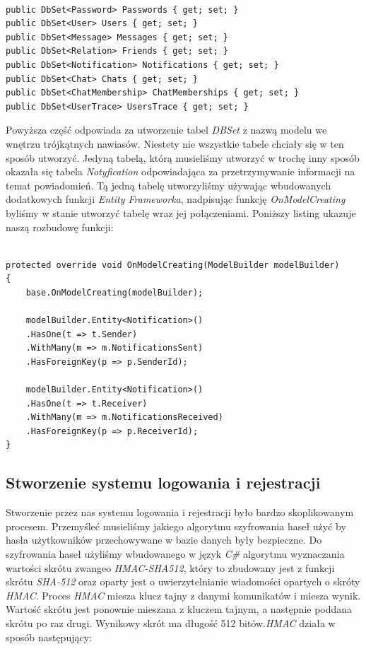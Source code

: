 \documentclass[12pt,a4paper]{article}
\begin{document}
\begin{lstlisting}[caption={DbContext Entity Framework}]

public DbSet<Password> Passwords { get; set; }
public DbSet<User> Users { get; set; }
public DbSet<Message> Messages { get; set; }
public DbSet<Relation> Friends { get; set; }
public DbSet<Notification> Notifications { get; set; }
public DbSet<Chat> Chats { get; set; }
public DbSet<ChatMembership> ChatMemberships { get; set; }
public DbSet<UserTrace> UsersTrace { get; set; }

\end{lstlisting}

\hspace*{0.7cm} Powyższa część odpowiada za utworzenie tabel \textit{DBSet} z nazwą modelu we wnętrzu trójkątnych nawiasów. Niestety nie wszystkie tabele chciały się w ten sposób utworzyć. Jedyną tabelą, którą musieliśmy utworzyć w trochę inny sposób okazała się tabela \textit{Notyfication} odpowiadająca za przetrzymywanie informacji na temat powiadomień. Tą jedną tabelę utworzyliśmy używając wbudowanych dodatkowych funkcji \textit{Entity Frameworka}, nadpisując funkcję \textit{OnModelCreating} byliśmy w stanie utworzyć tabelę wraz jej połączeniami. Poniższy listing ukazuje naszą rozbudowę funkcji:\newline

\begin{lstlisting}[caption={OnModelCreating tabela Notyfication - Entity Framework}]

protected override void OnModelCreating(ModelBuilder modelBuilder)
{
	base.OnModelCreating(modelBuilder);
	
	modelBuilder.Entity<Notification>()
	.HasOne(t => t.Sender)
	.WithMany(m => m.NotificationsSent)
	.HasForeignKey(p => p.SenderId);
	
	modelBuilder.Entity<Notification>()
	.HasOne(t => t.Receiver)
	.WithMany(m => m.NotificationsReceived)
	.HasForeignKey(p => p.ReceiverId);
}
\end{lstlisting}

\subsection{Stworzenie systemu logowania i rejestracji}

\hspace*{0.7cm} Stworzenie przez nas systemu logowania i rejestracji było bardzo skoplikowanym procesem. Przemyśleć musieliśmy jakiego algorytmu szyfrowania haseł użyć by hasła użytkowników przechowywane w bazie danych były bezpieczne. Do szyfrowania haseł użyliśmy wbudowanego w język \textit{C\#} algorytmu wyznaczania wartości skrótu zwangeo \textit{HMAC-SHA512}, który to zbudowany jest z funkcji skrótu \textit{SHA-512} oraz oparty jest o uwierzytelnianie wiadomości opartych o skróty \textit{HMAC}. Proces \textit{HMAC} miesza klucz tajny z danymi komunikatów i miesza wynik. Wartość skrótu jest ponownie mieszana z kluczem tajnym, a następnie poddana skrótu po raz drugi. Wynikowy skrót ma długość 512 bitów.\textit{HMAC} działa w sposób następujący:\newline
\end{document}
